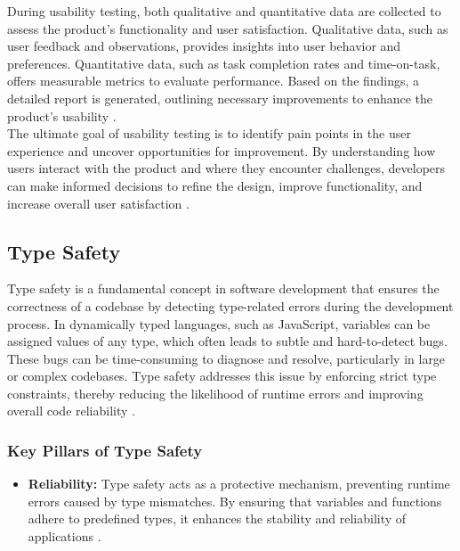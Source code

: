 {During usability testing, both qualitative and quantitative data are collected to assess the product's functionality and user satisfaction. Qualitative data, such as user feedback and observations, provides insights into user behavior and preferences. Quantitative data, such as task completion rates and time-on-task, offers measurable metrics to evaluate performance. Based on the findings, a detailed report is generated, outlining necessary improvements to enhance the product's usability \cite{geeksforgeeks:user-test}. \\

The ultimate goal of usability testing is to identify pain points in the user experience and uncover opportunities for improvement. By understanding how users interact with the product and where they encounter challenges, developers can make informed decisions to refine the design, improve functionality, and increase overall user satisfaction \cite{geeksforgeeks:user-test}.

\subsection{Type Safety}
\label{subsec:type-safety}

Type safety is a fundamental concept in software development that ensures the correctness of a codebase by detecting type-related errors during the development process. In dynamically typed languages, such as JavaScript, variables can be assigned values of any type, which often leads to subtle and hard-to-detect bugs. These bugs can be time-consuming to diagnose and resolve, particularly in large or complex codebases. Type safety addresses this issue by enforcing strict type constraints, thereby reducing the likelihood of runtime errors and improving overall code reliability \cite{dev:type-safety}.

\subsubsection*{Key Pillars of Type Safety}
\label{subsubsec:type-safety-pillars}

\begin{itemize}
    \item \textbf{Reliability:} Type safety acts as a protective mechanism, preventing runtime errors caused by type mismatches. By ensuring that variables and functions adhere to predefined types, it enhances the stability and reliability of applications \cite{dev:type-safety}.


\end{itemize}}
